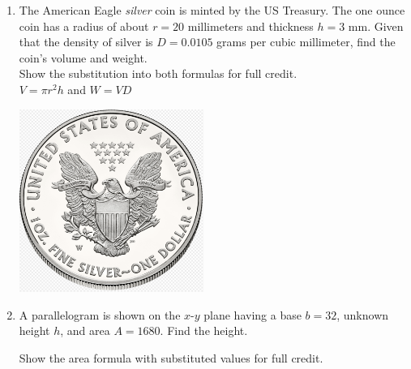 \documentclass[12pt, twoside]{article}
\begin{document}
\begin{enumerate}
\newpage
\item The American Eagle \emph{silver} coin is minted by the US Treasury. The one ounce coin has a radius of about $r=20$ millimeters and thickness $h=3$ mm. Given that the density of silver is $D = 0.0105$ grams per cubic millimeter, find the coin's volume and weight. \\[0.25cm]
Show the substitution into both formulas for full credit.\\[0.5cm]
$\displaystyle V = \pi r^2 h$ and $W=VD$
  \begin{flushright}
    \includegraphics[width=6cm]{6-17-5-coin.png}
  \end{flushright}
  
  
\newpage
\item A parallelogram is shown on the $x$-$y$ plane having a base $b=32$, unknown height $h$, and area $A=1680$. Find the height. 
  \begin{multicols}{2}
    Show the area formula with substituted values for full credit.
      \begin{flushright}
      \end{flushright}
  \end{multicols} 


\end{enumerate}
\end{document}
